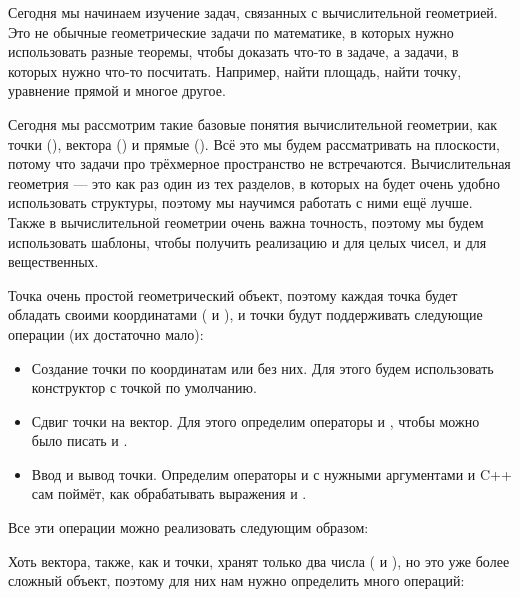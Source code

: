 Сегодня мы начинаем изучение задач, связанных с вычислительной геометрией. Это не обычные геометрические задачи по математике, в которых нужно использовать разные теоремы, чтобы доказать что-то в задаче, а задачи, в которых нужно что-то посчитать. Например, найти площадь, найти точку, уравнение прямой и многое другое.

Сегодня мы рассмотрим такие базовые понятия вычислительной геометрии, как точки (), вектора () и прямые (). Всё это мы будем рассматривать на плоскости, потому что задачи про трёхмерное пространство не встречаются. Вычислительная геометрия — это как раз один из тех разделов, в которых на будет очень удобно использовать структуры, поэтому мы научимся работать с ними ещё лучше. Также в вычислительной геометрии очень важна точность, поэтому мы будем использовать шаблоны, чтобы получить реализацию и для целых чисел, и для вещественных.


Точка очень простой геометрический объект, поэтому каждая точка будет обладать своими координатами ( и ), и точки будут поддерживать следующие операции (их достаточно мало):

\begin{itemize}
    \item Создание точки по координатам или без них. Для этого будем использовать конструктор с точкой  по умолчанию.
    \item Сдвиг точки на вектор. Для этого определим операторы \lcpp{+} и \lcpp{-}, чтобы можно было писать  и .
    \item Ввод и вывод точки. Определим операторы \lcpp{>>} и \lcpp{<<} с нужными аргументами и C++ сам поймёт, как обрабатывать выражения  и .
\end{itemize}

Все эти операции можно реализовать следующим образом:



Хоть вектора, также, как и точки, хранят только два числа ( и ), но это уже более сложный объект, поэтому для них нам нужно определить много операций:

